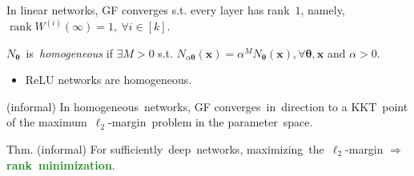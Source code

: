 \documentclass[handout,usenames,dvipsnames]{beamer} %
\DeclareMathOperator{\rank}{rank}
\newcommand{\bx}{\mathbf{x}}
\newcommand{\btheta}{{\boldsymbol{\theta}}}
\newcommand{\true}[1]{{\textcolor{ForestGreen}{\textbf{#1}}}}
\begin{document}
\begin{frame}
    \pause
    \begin{exampleblock}{\cite{ji2018gradient, ji2020directional} \hfill\checkmark}
        In linear networks, GF converges s.t. every layer has rank~$1$, namely, $\rank W^{(i)}(\infty) = 1, ~\forall i \in [k]$.
    \end{exampleblock}
    \pause
    \begin{definition}
        $N_\btheta$~is~\emph{homogeneous} if $\exists M > 0$ s.t. $N_{\alpha \btheta}(\bx) = \alpha^M N_\btheta(\bx), \forall \btheta,\bx$ and $\alpha>0$.
    \end{definition}
    \pause
    \begin{itemize}
        \item ReLU networks are homogeneous.
    \end{itemize}
    \pause
    \begin{exampleblock}{\cite{lyu2019gradient,ji2020directional} (informal) \hfill\checkmark}
          In homogeneous~networks, GF converges~in~direction to a KKT~point of the maximum~$\ell_2$-margin~problem in the parameter~space.
    \end{exampleblock}
    \pause
    \begin{exampleblock}{Thm. (informal)}
        For sufficiently~deep~networks, maximizing~the~$\ell_2$-margin $\Rightarrow$ \true{rank~minimization}.
    \end{exampleblock}
    

\end{frame}
\end{document}
